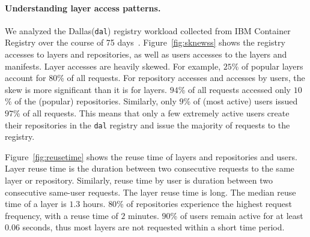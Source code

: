 


\paragraph{Understanding layer access patterns.}
We analyzed the Dallas(\texttt{dal}) registry workload collected from IBM Container Registry over the course of 75 days~\cite{dockerworkload}. 
Figure~\ref{fig:sknewss} shows the registry accesses to layers and repositories, as well as users accesses to the layers and manifests.
Layer accesses are heavily skewed. For example, $25$\% of popular layers account for $80$\% of all requests. 
For repository accesses and accesses by users, the skew is more significant than it is for layers. %
$94$\% of all requests accessed only $10$\% of the (popular) repositories. Similarly, only $9$\% of (most active) users issued $97$\% of all requests. 
This means that only a few extremely active users create their repositories in the \texttt{dal} registry and issue the majority of requests to the registry.

Figure~\ref{fig:reusetime} shows the reuse time of layers and repositories and users.
Layer reuse time is the duration between two consecutive requests to the same layer or repository. Similarly,
reuse time by user is duration between two consecutive same-user requests.
The layer reuse time is long.
The median reuse time of a layer is $1.3$ hours. $80$\% of repositories experience the highest request frequency, with a reuse time of $2$ minutes. 
$90$\% of users remain active for at least $0.06$ seconds, thus most layers are not requested within a short time period.

